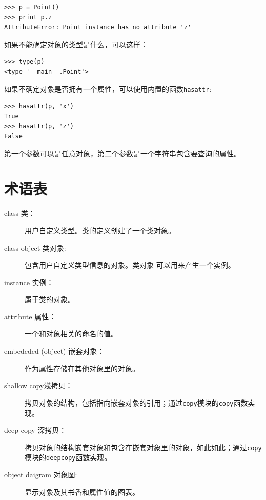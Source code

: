 \beforeverb
\begin{verbatim}
>>> p = Point()
>>> print p.z
AttributeError: Point instance has no attribute 'z'
\end{verbatim}
\afterverb

如果不能确定对象的类型是什么，可以这样：


\beforeverb
\begin{verbatim}
>>> type(p)
<type '__main__.Point'>
\end{verbatim}
\afterverb
%

如果不确定对象是否拥有一个属性，可以使用内置的函数{\tt hasattr}:

\beforeverb
\begin{verbatim}
>>> hasattr(p, 'x')
True
>>> hasattr(p, 'z')
False
\end{verbatim}
\afterverb
%

第一个参数可以是任意对象，第二个参数是一个字符串包含要查询的属性。

\section{术语表}

\begin{description}

\item [class 类：] 用户自定义类型。类的定义创建了一个类对象。

\item [class object 类对象:] 包含用户自定义类型信息的对象。类对象
可以用来产生一个实例。

\item [instance 实例：]属于类的对象。

\item [attribute 属性：]一个和对象相关的命名的值。

\item [embededed (object) 嵌套对象：]作为属性存储在其他对象里的对象。

\item [shallow copy浅拷贝：]拷贝对象的结构，包括指向嵌套对象的引用；通过{\tt copy}模块的{\tt copy}函数实现。

\item [deep copy 深拷贝：]拷贝对象的结构嵌套对象和包含在嵌套对象里的对象，如此如此；通过{\tt copy}模块的{\tt deepcopy}函数实现。

\item [object daigram 对象图:]显示对象及其书香和属性值的图表。
\end{description}

